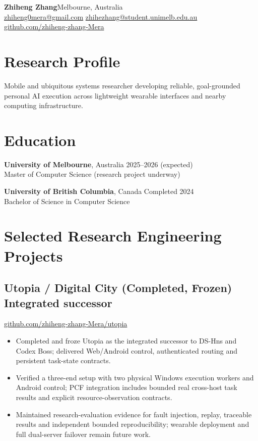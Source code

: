 \documentclass[10pt,a4paper]{article}
\begin{document}
{\LARGE\bfseries Zhiheng Zhang}\hfill Melbourne, Australia\\
\href{mailto:zhiheng0mera@gmail.com}{zhiheng0mera@gmail.com}\quad
\href{mailto:zhihezhang@student.unimelb.edu.au}{zhihezhang@student.unimelb.edu.au}\\
\href{https://github.com/zhiheng-zhang-Mera}{github.com/zhiheng-zhang-Mera}

\section{Research Profile}
Mobile and ubiquitous systems researcher developing reliable, goal-grounded personal AI execution across lightweight wearable interfaces and nearby computing infrastructure.

\section{Education}
\textbf{University of Melbourne}, Australia \hfill 2025--2026 (expected)\\
Master of Computer Science (research project underway)

\textbf{University of British Columbia}, Canada \hfill Completed 2024\\
Bachelor of Science in Computer Science

\section{Selected Research Engineering Projects}
\subsection*{Utopia / Digital City (Completed, Frozen) \hfill \small Integrated successor}
\href{https://github.com/zhiheng-zhang-Mera/utopia}{github.com/zhiheng-zhang-Mera/utopia}
\begin{itemize}
\item Completed and froze Utopia as the integrated successor to DS-Hns and Codex Boss; delivered Web/Android control, authenticated routing and persistent task-state contracts.
\item Verified a three-end setup with two physical Windows execution workers and Android control; PCF integration includes bounded real cross-host task results and explicit resource-observation contracts.
\item Maintained research-evaluation evidence for fault injection, replay, traceable results and independent bounded reproducibility; wearable deployment and full dual-server failover remain future work.
\end{itemize}
\end{document}
